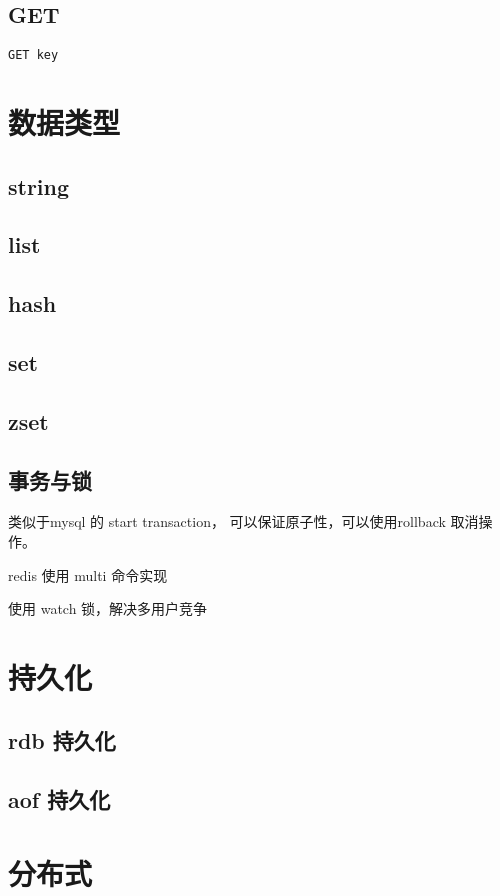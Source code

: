 \documentclass[UTF8,a4paper,12pt]{ctexbook}
\begin{document}
	\section{GET}\verb|GET key|
	

\chapter{数据类型}	
	\section{string}
	
	\section{list}
	
	\section{hash}
	
	\section{set}
	
	\section{zset}
	
	\section{事务与锁}
		类似于mysql 的 start transaction， 可以保证原子性，可以使用rollback 取消操作。
		
		redis 使用 multi  命令实现
		
		使用 watch 锁，解决多用户竞争

\chapter{持久化}	
	\section{rdb 持久化}
	
	
	\section{aof 持久化}
	

\chapter{分布式}	
\end{document}
